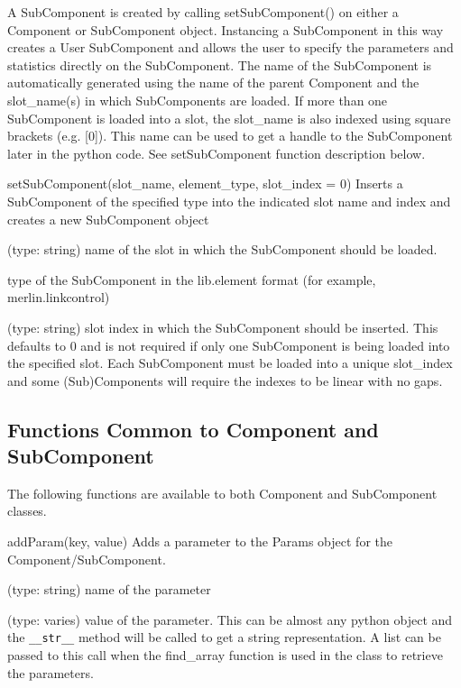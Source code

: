 A SubComponent is created by calling setSubComponent() on either a
Component or SubComponent object.  Instancing a SubComponent in this
way creates a User SubComponent and allows the user to specify the
parameters and statistics directly on the SubComponent.  The name of
the SubComponent is automatically generated using the name of the
parent Component and the slot\_name(s) in which SubComponents are
loaded.  If more than one SubComponent is loaded into a slot, the
slot\_name is also indexed using square brackets (e.g. [0]).  This
name can be used to get a handle to the SubComponent later in the
python code.  See setSubComponent function description below.


\begin{functiondoc}{setSubComponent(slot_name, element_type, slot_index = 0)}
  { Inserts a SubComponent of the specified type into the indicated
    slot name and index and creates a new SubComponent object }

   (type: string) name of the slot in which the
  SubComponent should be loaded.

   type of the SubComponent in the lib.element
  format (for example, merlin.linkcontrol)

   (type: string) slot index in which the
  SubComponent should be inserted.  This defaults to 0 and is not
  required if only one SubComponent is being loaded into the specified
  slot.  Each SubComponent must be loaded into a unique slot\_index
  and some (Sub)Components will require the indexes to be linear with
  no gaps.

\end{functiondoc}


\subsection{Functions Common to Component and SubComponent}

The following functions are available to both Component and SubComponent classes.

\begin{functiondoc}[subsubsection]{addParam(key, value)}
  { Adds a parameter to the Params object for the Component/SubComponent.}

   (type: string) name of the parameter

   (type: varies) value of the parameter.  This can be
  almost any python object and the \lstinline{__str__} method will be
  called to get a string representation.  A list can be passed to this
  call when the find\_array function is used in the class to retrieve
  the parameters.

\noreturn
\end{functiondoc}

